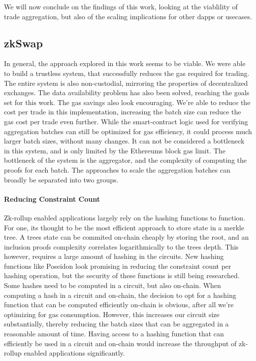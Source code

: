 \documentclass[../../thesis.tex]{subfiles}
\begin{document}
We will now conclude on the findings of this work, looking at the viablility of trade aggregation, but also of the scaling implications for other dapps or usecases. 

\subsection{zkSwap}
In general, the approach explored in this work seems to be viable. We were able to build a trustless system, that successfully reduces the gas required for trading. The entire system is also non-custodial, mirroring the properties of decentralized exchanges. The data availability problem has also been solved, reaching the goals set for this work. The gas savings also look encouraging. We're able to reduce the cost per trade in this implementation, increasing the batch size can reduce the gas cost per trade even further. While the smart-contract logic used for verifying aggregation batches can still be optimized for gas efficiency, it could process much larger batch sizes, without many changes. It can not be considered a bottleneck in this system, and is only limited by the Ethereums block gas limit. The bottleneck of the system is the aggregator, and the complexity of computing the proofs for each batch. The approaches to scale the aggregation batches can broadly be separated into two groups.

\paragraph{Reducing Constraint Count}
Zk-rollup enabled applications largely rely on the hashing functions to function. For one, its thought to be the most efficient approach to store state in a merkle tree. A trees state can be commited on-chain cheaply by storing the root, and an inclusion proofs complexity correlates logarithmically to the trees depth. This however, requires a large amount of hashing in the circuits. New hashing functions like Poseidon look promising in reducing the constraint count per hashing operation, but the security of these functions is still being researched. Some hashes need to be computed in a circuit, but also on-chain. When computing a hash in a circuit and on-chain, the decision to opt for a hashing function that can be computed efficiently on-chain is obvious, after all we're optimizing for gas consumption. However, this increases our circuit size substantially, thereby reducing the batch sizes that can be aggregated in a reasonable amount of time. Having access to a hashing function that can efficiently be used in a circuit and on-chain would increase the throughput of zk-rollup enabled applications significantly. 
\end{document}
